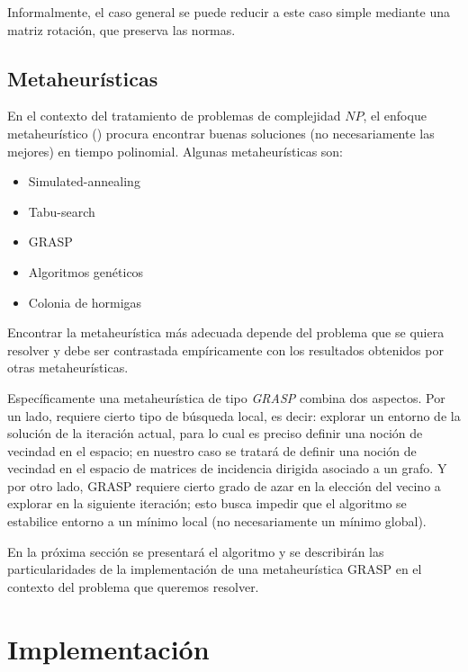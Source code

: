 \documentclass[conference,compsoc,a4paper]{IEEEtran}
\begin{document}
\smallskip

Informalmente, el caso general se puede reducir a este caso simple 
mediante una matriz rotación, que preserva las normas.

\subsection{Metaheurísticas}

En el contexto del tratamiento de problemas de complejidad $NP$, el 
enfoque metaheurístico (\cite{GP:2010,Talbi:2009}) procura encontrar buenas soluciones (no 
necesariamente las mejores) en tiempo polinomial. Algunas 
metaheurísticas son:

\begin{itemize}
	\item Simulated-annealing
	\item Tabu-search
	\item GRASP
	\item Algoritmos genéticos
	\item Colonia de hormigas
\end{itemize}

Encontrar la metaheurística más adecuada depende del problema que se 
quiera resolver y debe ser contrastada empíricamente con los resultados 
obtenidos por otras metaheurísticas.

\smallskip

Específicamente una metaheurística de tipo \textit{GRASP} combina dos 
aspectos. Por un lado, requiere cierto tipo de búsqueda local, es decir: 
explorar un entorno de la solución de la iteración actual, para lo cual 
es preciso definir una noción de vecindad en el espacio; en nuestro caso 
se tratará de definir una noción de vecindad en el espacio de matrices 
de incidencia dirigida asociado a un grafo. Y por otro lado, GRASP 
requiere cierto grado de azar en la elección del vecino a explorar en 
la siguiente iteración; esto busca impedir que el algoritmo se 
estabilice entorno a un mínimo local (no necesariamente un mínimo 
global). 

\smallskip

En la próxima sección se presentará el algoritmo y se describirán las 
particularidades de la implementación de una metaheurística GRASP en el 
contexto del problema que queremos resolver.

\section{Implementación}
\end{document}
